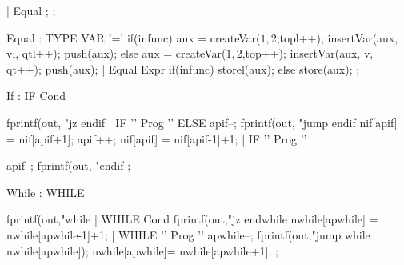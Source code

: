 \documentclass{report}
\begin{document}
\begin{code}
        | Equal                                 { ; }       
        ;

Equal   : TYPE VAR '='                          { if(infunc){
                                                    aux = createVar($1,$2,topl++);
                                                    insertVar(aux, vl, qtl++);
                                                    push(aux);
                                                  }
                                                  else{
                                                    aux = createVar($1,$2,top++); 
                                                    insertVar(aux, v, qt++);
                                                    push(aux);
                                                  }
                                                }
        | Equal Expr                            { if(infunc){
                                                    storel(aux);
                                                  }
                                                  else{
                                                    store(aux);
                                                  } 
                                                }
        ;


If      : IF Cond               { fprintf(out, "jz endif%
        | IF '{' Prog '}' ELSE  { apif--; fprintf(out, "jump endif%
                                nif[apif] = nif[apif+1]; apif++; nif[apif] = nif[apif-1]+1; 
                                }
        | IF '{' Prog '}'       { apif--; fprintf(out, "endif%
        ;

While   : WHILE          { fprintf(out,"while%
        | WHILE Cond     { fprintf(out,"jz endwhile%
                          nwhile[apwhile] = nwhile[apwhile-1]+1; }
        | WHILE '{' Prog '}' { apwhile--; fprintf(out,"jump while%
        nwhile[apwhile]); nwhile[apwhile]= nwhile[apwhile+1]; 
                             }
        ;

}}}
\end{code}
\end{document}
